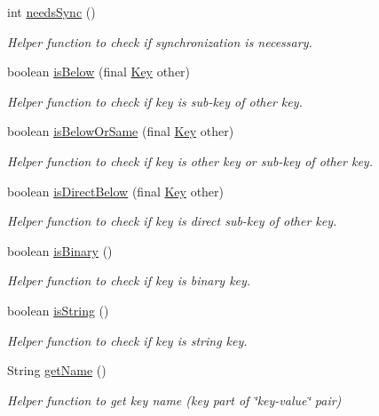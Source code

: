 \begin{DoxyCompactItemize}
int \hyperlink{classorg_1_1libelektra_1_1Key_a6f5afab907a28b264af0981e9db58c64}{needs\+Sync} ()
\begin{DoxyCompactList}\small\item\em Helper function to check if synchronization is necessary. \end{DoxyCompactList}\item 
boolean \hyperlink{classorg_1_1libelektra_1_1Key_af9a7a7941c07c058f1d4bd6c55e20fe9}{is\+Below} (final \hyperlink{classorg_1_1libelektra_1_1Key}{Key} other)
\begin{DoxyCompactList}\small\item\em Helper function to check if key is sub-\/key of other key. \end{DoxyCompactList}\item 
boolean \hyperlink{classorg_1_1libelektra_1_1Key_ab3143b14824a384ec4b6f9005f6da554}{is\+Below\+Or\+Same} (final \hyperlink{classorg_1_1libelektra_1_1Key}{Key} other)
\begin{DoxyCompactList}\small\item\em Helper function to check if key is other key or sub-\/key of other key. \end{DoxyCompactList}\item 
boolean \hyperlink{classorg_1_1libelektra_1_1Key_a799b0577d5e1491702e45566c943bda4}{is\+Direct\+Below} (final \hyperlink{classorg_1_1libelektra_1_1Key}{Key} other)
\begin{DoxyCompactList}\small\item\em Helper function to check if key is direct sub-\/key of other key. \end{DoxyCompactList}\item 
boolean \hyperlink{classorg_1_1libelektra_1_1Key_a2323fd06287eac6343ed60756f3cc9c1}{is\+Binary} ()
\begin{DoxyCompactList}\small\item\em Helper function to check if key is binary key. \end{DoxyCompactList}\item 
boolean \hyperlink{classorg_1_1libelektra_1_1Key_acb0e1141fa920b798a66a2076cd61562}{is\+String} ()
\begin{DoxyCompactList}\small\item\em Helper function to check if key is string key. \end{DoxyCompactList}\item 
String \hyperlink{classorg_1_1libelektra_1_1Key_a668626c8403940015ff5031cfa5e973c}{get\+Name} ()
\begin{DoxyCompactList}\small\item\em Helper function to get key name (key part of \char`\"{}key-\/value\char`\"{} pair) \end{DoxyCompactList}\item 

\end{DoxyCompactItemize}
